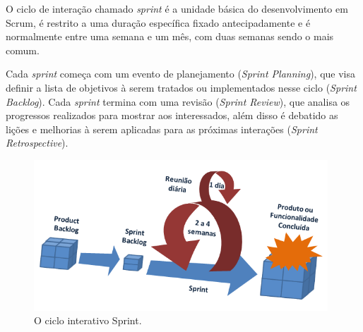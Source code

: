 \par O ciclo de interação chamado \emph{sprint} é a unidade básica do desenvolvimento em Scrum, é restrito a uma duração específica fixado antecipadamente e é normalmente entre uma semana e um mês, com duas semanas sendo o mais comum.
\par Cada \emph{sprint} começa com um evento de planejamento (\emph{Sprint Planning}), que visa definir a lista de objetivos à serem tratados ou implementados nesse ciclo (\emph{Sprint Backlog}). Cada \emph{sprint} termina com uma revisão (\emph{Sprint Review}), que analisa os progressos realizados para mostrar aos interessados, além disso é debatido as lições e melhorias à serem aplicadas para as próximas interações (\emph{Sprint Retrospective}).
\begin{figure}[!htb]
\centering
\includegraphics[width=11cm]{figuras/scrum_process}
\caption{\label{fig:scrum_process}O ciclo interativo Sprint.}
\end{figure}
